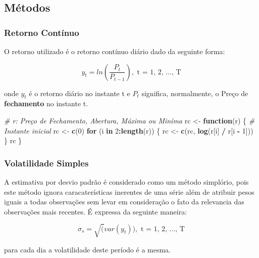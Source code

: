 \documentclass[]{article}
\newenvironment{Shaded}{\begin{snugshade}}{\end{snugshade}}
\newcommand{\KeywordTok}[1]{\textcolor[rgb]{0.13,0.29,0.53}{\textbf{#1}}}
\newcommand{\DecValTok}[1]{\textcolor[rgb]{0.00,0.00,0.81}{#1}}
\newcommand{\StringTok}[1]{\textcolor[rgb]{0.31,0.60,0.02}{#1}}
\newcommand{\CommentTok}[1]{\textcolor[rgb]{0.56,0.35,0.01}{\textit{#1}}}
\newcommand{\ControlFlowTok}[1]{\textcolor[rgb]{0.13,0.29,0.53}{\textbf{#1}}}
\newcommand{\OperatorTok}[1]{\textcolor[rgb]{0.81,0.36,0.00}{\textbf{#1}}}
\newcommand{\NormalTok}[1]{#1}
\begin{document}

\subsection{Métodos}\label{metodos}

\subsubsection{Retorno Contínuo}\label{retorno-continuo}

O retorno utilizado é o retorno contínuo diário dado da seguinte forma:

\[y_t = ln(\frac{P_t}{P_{t-1}}), \text{ t = 1, 2, ..., T}\]

onde \(y_t\) é o retorno diário no instante t e \(P_t\) significa,
normalmente, o Preço de \textbf{fechamento} no instante t.

\begin{Shaded}
\begin{Highlighting}[]
\CommentTok{# r: Preço de Fechamento, Abertura, Máxima ou Miníma}
\NormalTok{rc <-}\StringTok{ }\ControlFlowTok{function}\NormalTok{(r) \{}
    \CommentTok{# Instante inicial}
\NormalTok{    rc <-}\StringTok{ }\KeywordTok{c}\NormalTok{(}\DecValTok{0}\NormalTok{)}
    \ControlFlowTok{for}\NormalTok{ (i }\ControlFlowTok{in} \DecValTok{2}\OperatorTok{:}\KeywordTok{length}\NormalTok{(r)) \{}
\NormalTok{        rc <-}\StringTok{ }\KeywordTok{c}\NormalTok{(rc, }\KeywordTok{log}\NormalTok{(r[i] }\OperatorTok{/}\StringTok{ }\NormalTok{r[i }\OperatorTok{-}\StringTok{ }\DecValTok{1}\NormalTok{]))}
\NormalTok{    \}}
\NormalTok{    rc}
\NormalTok{\}}
\end{Highlighting}
\end{Shaded}

\subsubsection{Volatilidade Simples}\label{volatilidade-simples}

A estimativa por desvio padrão é considerado como um método simplório,
pois este método ignora caracaterísticas inerentes de uma série além de
atribuir pesos iguais a todas observações sem levar em consideração o
fato da relevancia das observações mais recentes. É expressa da seguinte
maneira:

\[\sigma_s = \sqrt(var(y_t)), \text{ t = 1, 2, ..., T}\]

para cada dia a volatilidade deste período é a mesma.
\end{document}
